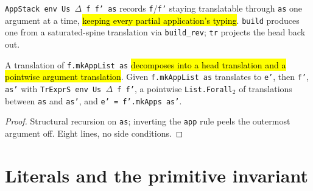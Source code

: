 \begin{definition}
\label{ind:appstack}
\leanok
{}
 \texttt{AppStack env Us $\Delta$ f f' as} records \texttt{f}/\texttt{f'} staying translatable through \texttt{as} one argument at a time, \hl{keeping every partial application's typing}. \texttt{build} produces one from a saturated-spine translation via \texttt{build\_rev}; \texttt{tr} projects the head back out.
\end{definition}

\begin{theorem}
\label{thm:trexprs-mkapplist-inv}
\leanok
{}
 

 A translation of \texttt{f.mkAppList as} \hl{decomposes into a head translation and a pointwise argument translation}. Given \texttt{f.mkAppList as} translates to \texttt{e'}, then \texttt{f'}, \texttt{as'} with \texttt{TrExprS env Us $\Delta$ f f'}, a pointwise \texttt{List.Forall}$_2$ of translations between \texttt{as} and \texttt{as'}, and \texttt{e' = f'.mkApps as'}.
\end{theorem}
\begin{proof}
\leanok
{} Structural recursion on \texttt{as}; inverting the \texttt{app} rule peels the outermost argument off. Eight lines, no side conditions.
\end{proof}

\section{Literals and the primitive invariant}

